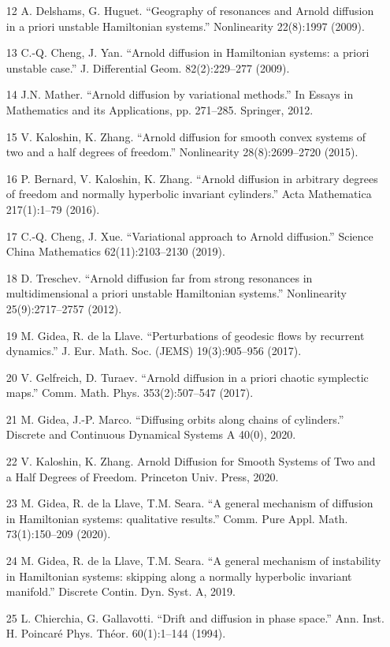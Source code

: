 \documentclass[12pt]{article}
\begin{document}
\begin{enumerate}
\item [12] A. Delshams, G. Huguet. ``Geography of resonances and Arnold diffusion in a priori unstable Hamiltonian systems.'' Nonlinearity 22(8):1997 (2009).
\item [13] C.-Q. Cheng, J. Yan. ``Arnold diffusion in Hamiltonian systems: a priori unstable case.'' J. Differential Geom. 82(2):229--277 (2009).
\item [14] J.N. Mather. ``Arnold diffusion by variational methods.'' In Essays in Mathematics and its Applications, pp. 271--285. Springer, 2012.
\item [15] V. Kaloshin, K. Zhang. ``Arnold diffusion for smooth convex systems of two and a half degrees of freedom.'' Nonlinearity 28(8):2699--2720 (2015).
\item [16] P. Bernard, V. Kaloshin, K. Zhang. ``Arnold diffusion in arbitrary degrees of freedom and normally hyperbolic invariant cylinders.'' Acta Mathematica 217(1):1--79 (2016).
\item [17] C.-Q. Cheng, J. Xue. ``Variational approach to Arnold diffusion.'' Science China Mathematics 62(11):2103--2130 (2019).
\item [18] D. Treschev. ``Arnold diffusion far from strong resonances in multidimensional a priori unstable Hamiltonian systems.'' Nonlinearity 25(9):2717--2757 (2012).
\item [19] M. Gidea, R. de la Llave. ``Perturbations of geodesic flows by recurrent dynamics.'' J. Eur. Math. Soc. (JEMS) 19(3):905--956 (2017).
\item [20] V. Gelfreich, D. Turaev. ``Arnold diffusion in a priori chaotic symplectic maps.'' Comm. Math. Phys. 353(2):507--547 (2017).
\item [21] M. Gidea, J.-P. Marco. ``Diffusing orbits along chains of cylinders.'' Discrete and Continuous Dynamical Systems A 40(0), 2020.
\item [22] V. Kaloshin, K. Zhang. Arnold Diffusion for Smooth Systems of Two and a Half Degrees of Freedom. Princeton Univ. Press, 2020.
\item [23] M. Gidea, R. de la Llave, T.M. Seara. ``A general mechanism of diffusion in Hamiltonian systems: qualitative results.'' Comm. Pure Appl. Math. 73(1):150--209 (2020).
\item [24] M. Gidea, R. de la Llave, T.M. Seara. ``A general mechanism of instability in Hamiltonian systems: skipping along a normally hyperbolic invariant manifold.'' Discrete Contin. Dyn. Syst. A, 2019.
\item [25] L. Chierchia, G. Gallavotti. ``Drift and diffusion in phase space.'' Ann. Inst. H. Poincaré Phys. Théor. 60(1):1--144 (1994).

\end{enumerate}
\end{document}

